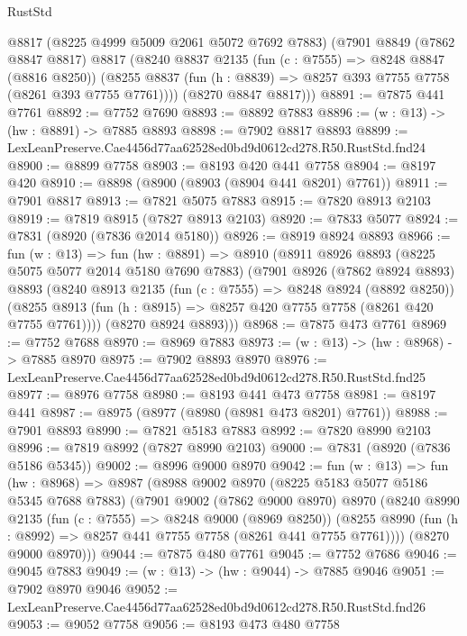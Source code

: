 \begin{lexlean}{RustStd}
\begin{coremodule}
      @8817
      (@8225 @4999 @5009 @2061 @5072 @7692 @7883)
      (@7901
        @8849
        (@7862 @8847 @8817)
        @8817
        (@8240
          @8837
          @2135
          (fun (c : @7555) => @8248 @8847 (@8816 @8250))
          (@8255 @8837 (fun (h : @8839) => @8257 @393 @7755 @7758 (@8261 @393 @7755 @7761))))
        (@8270 @8847 @8817)))
@8891 := @7875 @441 @7761
@8892 := @7752 @7690
@8893 := @8892 @7883
@8896 := (w : @13) -> (hw : @8891) -> @7885 @8893
@8898 := @7902 @8817 @8893
@8899 := LexLeanPreserve.Cae4456d77aa62528ed0bd9d0612cd278.R50.RustStd.fnd24
@8900 := @8899 @7758
@8903 := @8193 @420 @441 @7758
@8904 := @8197 @420
@8910 := @8898 (@8900 (@8903 (@8904 @441 @8201) @7761))
@8911 := @7901 @8817
@8913 := @7821 @5075 @7883
@8915 := @7820 @8913 @2103
@8919 := @7819 @8915 (@7827 @8913 @2103)
@8920 := @7833 @5077
@8924 := @7831 (@8920 (@7836 @2014 @5180))
@8926 := @8919 @8924 @8893
@8966 := fun (w : @13) =>
  fun (hw : @8891) =>
  @8910
    (@8911
      @8926
      @8893
      (@8225 @5075 @5077 @2014 @5180 @7690 @7883)
      (@7901
        @8926
        (@7862 @8924 @8893)
        @8893
        (@8240
          @8913
          @2135
          (fun (c : @7555) => @8248 @8924 (@8892 @8250))
          (@8255 @8913 (fun (h : @8915) => @8257 @420 @7755 @7758 (@8261 @420 @7755 @7761))))
        (@8270 @8924 @8893)))
@8968 := @7875 @473 @7761
@8969 := @7752 @7688
@8970 := @8969 @7883
@8973 := (w : @13) -> (hw : @8968) -> @7885 @8970
@8975 := @7902 @8893 @8970
@8976 := LexLeanPreserve.Cae4456d77aa62528ed0bd9d0612cd278.R50.RustStd.fnd25
@8977 := @8976 @7758
@8980 := @8193 @441 @473 @7758
@8981 := @8197 @441
@8987 := @8975 (@8977 (@8980 (@8981 @473 @8201) @7761))
@8988 := @7901 @8893
@8990 := @7821 @5183 @7883
@8992 := @7820 @8990 @2103
@8996 := @7819 @8992 (@7827 @8990 @2103)
@9000 := @7831 (@8920 (@7836 @5186 @5345))
@9002 := @8996 @9000 @8970
@9042 := fun (w : @13) =>
  fun (hw : @8968) =>
  @8987
    (@8988
      @9002
      @8970
      (@8225 @5183 @5077 @5186 @5345 @7688 @7883)
      (@7901
        @9002
        (@7862 @9000 @8970)
        @8970
        (@8240
          @8990
          @2135
          (fun (c : @7555) => @8248 @9000 (@8969 @8250))
          (@8255 @8990 (fun (h : @8992) => @8257 @441 @7755 @7758 (@8261 @441 @7755 @7761))))
        (@8270 @9000 @8970)))
@9044 := @7875 @480 @7761
@9045 := @7752 @7686
@9046 := @9045 @7883
@9049 := (w : @13) -> (hw : @9044) -> @7885 @9046
@9051 := @7902 @8970 @9046
@9052 := LexLeanPreserve.Cae4456d77aa62528ed0bd9d0612cd278.R50.RustStd.fnd26
@9053 := @9052 @7758
@9056 := @8193 @473 @480 @7758

\end{coremodule}
\end{lexlean}
